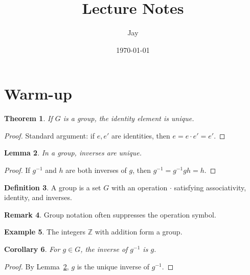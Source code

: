 \documentclass[12pt]{article}
\title{Lecture Notes}
\author{Jay}
\date{\today}
\newtheorem{theorem}{Theorem}[section]
\newtheorem{lemma}[theorem]{Lemma}
\newtheorem{corollary}[theorem]{Corollary}
\theoremstyle{definition}
\newtheorem{definition}[theorem]{Definition}
\newtheorem{remark}[theorem]{Remark}
\newtheorem{example}[theorem]{Example}
\begin{document}
\maketitle
\tableofcontents

\section{Warm-up}\label{sec:warmup}

\begin{theorem}\label{thm:identity}
If $G$ is a group, the identity element is unique.
\end{theorem}

\begin{proof}
Standard argument: if $e,e'$ are identities, then $e=e\cdot e'=e'$.
\end{proof}

\begin{lemma}\label{lem:inv-unique}
In a group, inverses are unique.
\end{lemma}

\begin{proof}
If $g^{-1}$ and $h$ are both inverses of $g$, then $g^{-1}=g^{-1}gh=h$.
\end{proof}

\begin{definition}\label{def:group}
A group is a set $G$ with an operation $\cdot$ satisfying associativity, identity, and inverses.
\end{definition}

\begin{remark}\label{rem:group-notation}
Group notation often suppresses the operation symbol.
\end{remark}

\begin{example}\label{ex:integers}
The integers $\mathbb{Z}$ with addition form a group.
\end{example}

\begin{corollary}\label{cor:inv-inv}
For $g\in G$, the inverse of $g^{-1}$ is $g$.
\end{corollary}

\begin{proof}
By Lemma~\ref{lem:inv-unique}, $g$ is the unique inverse of $g^{-1}$.
\end{proof}
\end{document}
